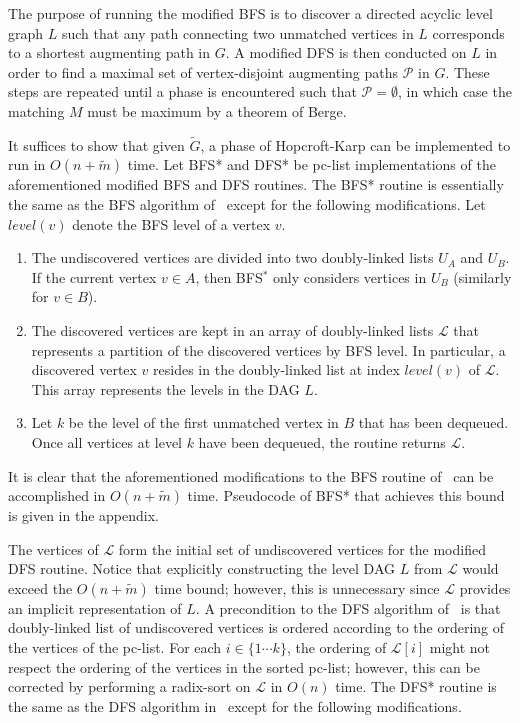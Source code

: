 \documentclass{llncs}
\begin{document}
The purpose of running the modified BFS is to discover a directed acyclic level graph $L$ such that any path connecting two unmatched vertices in $L$ corresponds to a shortest augmenting path in $G$.  A modified DFS is then conducted on $L$ in order to find a maximal set of vertex-disjoint augmenting paths $\mathcal{P}$ in $G$. These steps are repeated until a phase is encountered such that $\mathcal{P} = \emptyset$, in which case the matching $M$ must be maximum by a theorem of Berge. 

It suffices to show that given $\widetilde{G}$, a phase of Hopcroft-Karp can be implemented to run in $O(n+\widetilde{m})$ time. Let BFS* and DFS* be pc-list implementations of the aforementioned modified BFS and DFS routines.  The BFS* routine is essentially the same as the BFS algorithm of~\cite{DahlhausGM02} except for the following modifications.  Let $level(v)$ denote the BFS level of a vertex $v$.
\begin{enumerate}
\item The undiscovered vertices are divided into two doubly-linked lists $U_A$ and $U_B$.  If the current vertex $v \in A$, then BFS$^*$ only considers vertices in $U_B$ (similarly for $v \in B$).
\item The discovered vertices are kept in an array of doubly-linked lists $\mathcal{L}$ that represents a partition of the discovered vertices by BFS level.  In particular, a discovered vertex $v$ resides in the doubly-linked list at index $level(v)$ of $\mathcal{L}$.  This array represents the levels in the DAG $L$.
\item Let $k$ be the level of the first unmatched vertex in $B$ that has been dequeued. Once all vertices at level $k$ have been dequeued, the routine returns $\mathcal{L}$.
\end{enumerate}
 It is clear that the aforementioned modifications to the BFS routine of~\cite{DahlhausGM02} can be accomplished in $O(n+\widetilde{m})$ time.  Pseudocode of BFS* that achieves this bound is given in the appendix.
 
The vertices of $\mathcal{L}$ form the initial set of undiscovered vertices for the modified DFS routine.  Notice that explicitly constructing the level DAG $L$ from $\mathcal{L}$ would exceed the $O(n+\widetilde{m})$ time bound; however, this is unnecessary since $\mathcal{L}$ provides an implicit representation of $L$.
A precondition to the DFS algorithm of~\cite{LindzeyO13} is that doubly-linked list of undiscovered vertices is ordered according to the ordering of the vertices of the pc-list. For each $i \in \{1 \cdots k\}$, the ordering of $\mathcal{L}[i]$ might not respect the ordering of the vertices in the sorted pc-list; however, this can be corrected by performing a radix-sort on $\mathcal{L}$ in $O(n)$ time.  The DFS* routine is the same as the DFS algorithm in~\cite{LindzeyO13} except for the following modifications.
\end{document}
